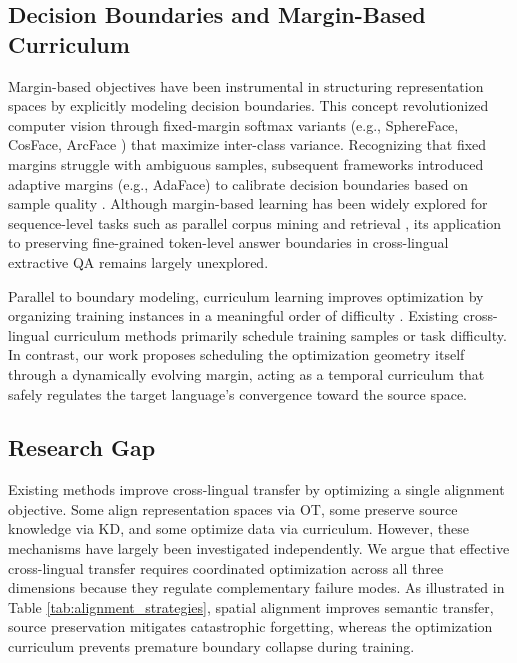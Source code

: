 \documentclass[11pt]{article}
\begin{document}
\subsection{Decision Boundaries and Margin-Based Curriculum}
Margin-based objectives have been instrumental in structuring representation spaces by explicitly modeling decision boundaries. This concept revolutionized computer vision through fixed-margin softmax variants (e.g., SphereFace\cite{wang2018cosfacelargemargincosine}, CosFace\cite{liu2018spherefacedeephypersphereembedding}, ArcFace \cite{Deng_2022}) that maximize inter-class variance. Recognizing that fixed margins struggle with ambiguous samples, subsequent frameworks introduced adaptive margins (e.g., AdaFace) to calibrate decision boundaries based on sample quality \cite{kim2023adafacequalityadaptivemargin}. Although margin-based learning has been widely explored for sequence-level tasks such as parallel corpus mining and retrieval \cite{artetxe-schwenk-2019-margin}, its application to preserving fine-grained token-level answer boundaries in cross-lingual extractive QA remains largely unexplored.

Parallel to boundary modeling, curriculum learning improves optimization by organizing training instances in a meaningful order of difficulty \cite{10.1145/1553374.1553380}. Existing cross-lingual curriculum methods primarily schedule training samples or task difficulty. In contrast, our work proposes scheduling the optimization geometry itself through a dynamically evolving margin, acting as a temporal curriculum that safely regulates the target language's convergence toward the source space.

\subsection{Research Gap}
Existing methods improve cross-lingual transfer by optimizing a single alignment objective. Some align representation spaces via OT, some preserve source knowledge via KD, and some optimize data via curriculum. However, these mechanisms have largely been investigated independently. We argue that effective cross-lingual transfer requires coordinated optimization across all three dimensions because they regulate complementary failure modes. As illustrated in Table \ref{tab:alignment_strategies}, spatial alignment improves semantic transfer, source preservation mitigates catastrophic forgetting, whereas the optimization curriculum prevents premature boundary collapse during training. 
\end{document}
